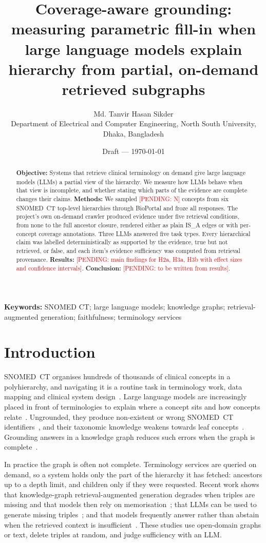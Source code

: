 \documentclass[11pt]{article}
\title{Coverage-aware grounding: measuring parametric fill-in when large language models explain \sct{} hierarchy from partial, on-demand retrieved subgraphs}
\author{Md. Tanvir Hasan Sikder\\
Department of Electrical and Computer Engineering, North South University, Dhaka, Bangladesh\\
\pending{supervisor and co-authors; confirm department name}}
\date{Draft --- \today}
\newcommand{\pending}[1]{\textcolor{red}{[PENDING: #1]}}
\newcommand{\sct}{SNOMED~CT}
\begin{document}
\maketitle

\begin{abstract}
\noindent\textbf{Objective:} Systems that retrieve clinical terminology on demand give large language models (LLMs) a partial view of the hierarchy. We measure how LLMs behave when that view is incomplete, and whether stating which parts of the evidence are complete changes their claims.
\textbf{Methods:} We sampled \pending{N} concepts from six \sct{} top-level hierarchies through BioPortal and froze all responses. The project's own on-demand crawler produced evidence under five retrieval conditions, from none to the full ancestor closure, rendered either as plain IS\_A edges or with per-concept coverage annotations. Three LLMs answered five task types. Every hierarchical claim was labelled deterministically as supported by the evidence, true but not retrieved, or false, and each item's evidence sufficiency was computed from retrieval provenance.
\textbf{Results:} \pending{main findings for H2a, H3a, H3b with effect sizes and confidence intervals}.
\textbf{Conclusion:} \pending{to be written from results}.
\end{abstract}

\noindent\textbf{Keywords:} SNOMED CT; large language models; knowledge graphs; retrieval-augmented generation; faithfulness; terminology services

\section{Introduction}

\sct{} organises hundreds of thousands of clinical concepts in a polyhierarchy, and navigating it is a routine task in terminology work, data mapping and clinical system design~\citep{rogers2008browsers}. Large language models are increasingly placed in front of terminologies to explain where a concept sits and how concepts relate~\citep{chang2024snomedllm}. Ungrounded, they produce non-existent or wrong \sct{} identifiers~\citep{born2026hallucinations,schmid2025gmds}, and their taxonomic knowledge weakens towards leaf concepts~\citep{sun2024taxonomies}. Grounding answers in a knowledge graph reduces such errors when the graph is complete~\citep{soman2024kgrag,ali2026ontology}.

In practice the graph is often not complete. Terminology services are queried on demand, so a system holds only the part of the hierarchy it has fetched: ancestors up to a depth limit, and children only if they were requested. Recent work shows that knowledge-graph retrieval-augmented generation degrades when triples are missing and that models then rely on memorisation~\citep{zhou2026brink}; that LLMs can be used to generate missing triples~\citep{xu2024gog}; and that models frequently answer rather than abstain when the retrieved context is insufficient~\citep{joren2025sufficient}. These studies use open-domain graphs or text, delete triples at random, and judge sufficiency with an LLM.
\end{document}
